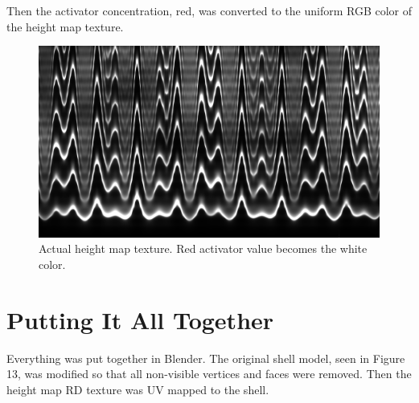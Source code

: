 \documentclass[a4paper]{article}
\begin{document}
Then the activator concentration, red, was converted to the uniform RGB color of the height map texture. 

\begin{figure}[h]
	\centering\includegraphics[scale=0.2]{./img/meinhardt-hexaplex.png}
	\caption{Actual height map texture. Red activator value becomes the white color. }
	\label{activator} %
\end{figure}

\pagebreak


\section{Putting It All Together}

Everything was put together in Blender. The original shell model, seen in Figure 13, was modified so that all non-visible vertices and faces were removed. Then the height map RD texture was UV mapped to the shell. 
\end{document}
